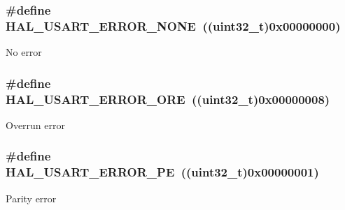 \subsubsection[{\texorpdfstring{H\+A\+L\+\_\+\+U\+S\+A\+R\+T\+\_\+\+E\+R\+R\+O\+R\+\_\+\+N\+O\+NE}{HAL_USART_ERROR_NONE}}]{\setlength{\rightskip}{0pt plus 5cm}\#define H\+A\+L\+\_\+\+U\+S\+A\+R\+T\+\_\+\+E\+R\+R\+O\+R\+\_\+\+N\+O\+NE~((uint32\+\_\+t)0x00000000)}\hypertarget{group___u_s_a_r_t___error___code_ga17532bdd4160fffddb630e7c8bcbb2f6}{}\label{group___u_s_a_r_t___error___code_ga17532bdd4160fffddb630e7c8bcbb2f6}
No error 
\subsubsection[{\texorpdfstring{H\+A\+L\+\_\+\+U\+S\+A\+R\+T\+\_\+\+E\+R\+R\+O\+R\+\_\+\+O\+RE}{HAL_USART_ERROR_ORE}}]{\setlength{\rightskip}{0pt plus 5cm}\#define H\+A\+L\+\_\+\+U\+S\+A\+R\+T\+\_\+\+E\+R\+R\+O\+R\+\_\+\+O\+RE~((uint32\+\_\+t)0x00000008)}\hypertarget{group___u_s_a_r_t___error___code_gae9a3360202080eefcffba1defac9e2a9}{}\label{group___u_s_a_r_t___error___code_gae9a3360202080eefcffba1defac9e2a9}
Overrun error 
\subsubsection[{\texorpdfstring{H\+A\+L\+\_\+\+U\+S\+A\+R\+T\+\_\+\+E\+R\+R\+O\+R\+\_\+\+PE}{HAL_USART_ERROR_PE}}]{\setlength{\rightskip}{0pt plus 5cm}\#define H\+A\+L\+\_\+\+U\+S\+A\+R\+T\+\_\+\+E\+R\+R\+O\+R\+\_\+\+PE~((uint32\+\_\+t)0x00000001)}\hypertarget{group___u_s_a_r_t___error___code_ga269cd569ad4cdd7f71fb981a4ab1f798}{}\label{group___u_s_a_r_t___error___code_ga269cd569ad4cdd7f71fb981a4ab1f798}
Parity error 